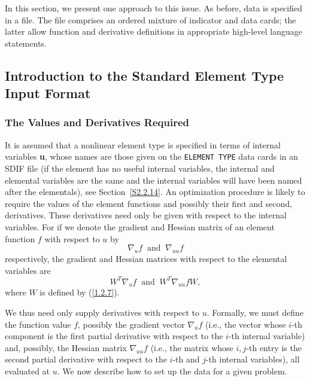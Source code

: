 \documentclass[a4paper]{article}
\newcommand{\req}[1]{(\ref{#1})}
\newcommand{\tim}[1]{\;\; \mbox{#1} \;\;}
\newcommand{\bdmath}{\begin{displaymath}}
\newcommand{\edmath}{\end{displaymath}}
\begin{document}
In  this section, we present one  approach to  this issue.  As before,
data is specified in a file. The file comprises  an ordered mixture of
indicator  and data  cards;
the latter  allow  function and derivative
definitions in appropriate high-level language statements.

\subsection[Introduction to the Standard Element Type \protect\\ Input
 Format]{\label{S3.1}Introduction to the Standard Element Type \protect\\ Input
 Format}

\subsubsection{\label{S3.1.1}The Values and Derivatives Required}

It is assumed that a nonlinear element type
is  specified in  terms of internal variables
{\bf u},  whose names
are those  given on the {\tt ELEMENT TYPE}
data  cards
in an SDIF file  (if   the element has  no useful internal
variables, the internal  and elemental
variables are  the same and the
internal variables will  have  been named  after  the elementals), see
Section~\ref{S2.2.14}.  An optimization procedure is likely to require
the  values of the   element functions
and possibly their first and second, derivatives.
These derivatives need only be given with respect
to the internal variables.
For if we denote the gradient
and Hessian
matrix of an element function
$f$ with respect to $u$ by
\bdmath
\nabla_u f \tim{and} \nabla_{uu} f
\edmath
respectively, the  gradient and  Hessian
matrices with  respect to the elemental variables
are
\bdmath
W^T \nabla_u f \tim{and} W^T \nabla_{uu} f W,
\edmath
where $W$ is defined by \req{1.2.7}.

We thus need only supply derivatives
with respect to $u$.  Formally, we must define the function value $f$,
possibly the  gradient
vector $\nabla_u   f$  (i.e., the vector  whose  $i$-th
component is the first partial derivative with  respect  to the $i$-th
internal variable) and,  possibly, the Hessian
matrix $\nabla_{uu} f$
(i.e.,   the matrix whose    $i,j$-th entry is    the  second  partial
derivative with respect to  the $i$-th and $j$-th internal variables),
all evaluated at $u$.   We now describe how  to set up  the data for a
given problem.
\end{document}
